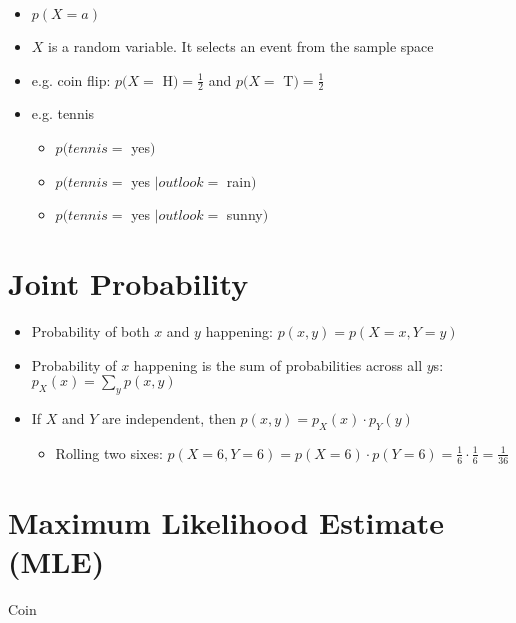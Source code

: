 \documentclass[11pt,letterpaper]{article}
\begin{document}
\begin{itemize}
  \item $p(X = a)$
  \item $X$ is a random variable.  It selects an event from the sample space
  \item e.g. coin flip: $p(X = $ H$) = \frac{1}{2}$ and $p(X = $ T$) = \frac{1}{2}$
  \item e.g. tennis
  \begin{itemize}
    \item $p(tennis = $ yes$)$
    \item $p(tennis = $ yes $ \mid outlook = $ rain$)$
    \item $p(tennis = $ yes $ \mid outlook = $ sunny$)$
  \end{itemize}
\end{itemize}


\section{Joint Probability}

\begin{itemize}
  \item Probability of both $x$ and $y$ happening: $p(x,y) = p(X = x, Y = y)$
  \item Probability of $x$ happening is the sum of probabilities across all $y$s: $p_X(x) = \sum_y p(x,y)$
  \item If $X$ and $Y$ are independent, then $p(x,y) = p_X(x) \cdot p_Y(y)$
  \begin{itemize}
    \item Rolling two sixes: $p(X=6,Y=6) = p(X=6) \cdot p(Y=6) = \frac{1}{6} \cdot \frac{1}{6} = \frac{1}{36}$
  \end{itemize}
\end{itemize}


\section{Maximum Likelihood Estimate (MLE)}

Coin
\end{document}
